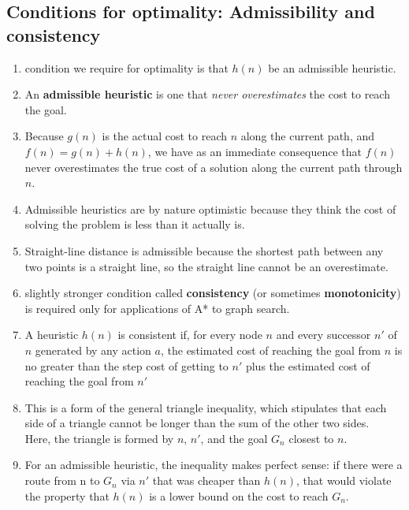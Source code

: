 \subsection{Conditions for optimality: Admissibility and consistency \cite{aci-1}}

\begin{enumerate}
    \item condition we require for optimality is that $h(n)$ be an admissible heuristic.

    \item An \textbf{admissible heuristic} is one that \textit{never overestimates} the cost to reach the goal.
    
    \item Because $g(n)$ is the actual cost to reach $n$ along the current path, and $f(n) = g(n) + h(n)$, we have as an immediate consequence that $f(n)$ never overestimates the true cost of a solution along the current path through $n$.

    \item Admissible heuristics are by nature optimistic because they think the cost of solving the problem is less than it actually is.

    \item Straight-line distance is admissible because the shortest path between any two points is a straight line, so the straight line cannot be an overestimate.

    \item slightly stronger condition called \textbf{consistency} (or sometimes \textbf{monotonicity}) is required only for applications of A* to graph search.

    \item A heuristic $h(n)$ is consistent if, for every node $n$ and every successor $n'$ of $n$ generated by any action $a$, the estimated cost of reaching the goal from $n$ is no greater than the step cost of getting to $n'$ plus the estimated cost of reaching the goal from $n'$

    \item This is a form of the general triangle inequality, which stipulates that each side of a triangle cannot be longer than the sum of the other two sides.\\
    Here, the triangle is formed by $n$, $n'$, and the goal $G_n$ closest to $n$. 

    \item For an admissible heuristic, the inequality makes perfect sense: if there were a route from n to $G_n$ via $n'$ that was cheaper than $h(n)$, that would violate the property that $h(n)$ is a lower bound on the cost to reach $G_n$.
\end{enumerate}

